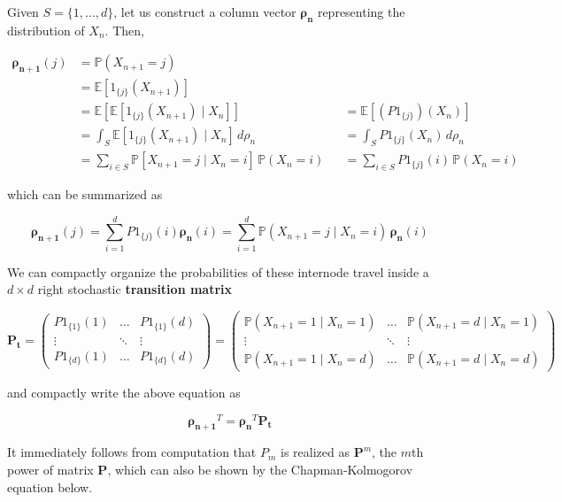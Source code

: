 \documentclass{article}
\begin{document}
  \begin{example}
    Given $S = \{1, \ldots, d\}$, let us construct a column vector $\boldsymbol{\rho_n}$ representing the distribution of $X_n$. Then, 

    \begin{align*}
      \boldsymbol{\rho_{n+1}} (j) & = \mathbb{P}(X_{n + 1} = j) \\
      & =  \mathbb{E}[1_{\{j\}} (X_{n+1})] \\
      & = \mathbb{E} [ \mathbb{E}[1_{\{j\}} (X_{n+1}) \mid X_n] ] && = \mathbb{E}[(P 1_{\{j\}}) (X_n)] \\
      & = \int_S \mathbb{E}[1_{\{j\}} (X_{n+1}) \mid X_n] \, d\rho_n && = \int_S P 1_{\{j\}} (X_n) \, d\rho_n \\
      & = \sum_{i \in S} \mathbb{P}[ X_{n+1} = j \mid X_n = i] \, \mathbb{P}(X_n = i) && = \sum_{i \in S} P 1_{\{j\}} (i) \, \mathbb{P}(X_n = i) 
    \end{align*}

    which can be summarized as 

    \[\boldsymbol{\rho_{n + 1}} (j) = \sum_{i = 1}^d P 1_{\{j\}} (i) \boldsymbol{\rho_n} (i) = \sum_{i = 1}^d \mathbb{P}(X_{n+1} = j \mid X_n = i) \, \boldsymbol{\rho_n} (i)\]

    We can compactly organize the probabilities of these internode travel inside a $d \times d$ right stochastic \textbf{transition matrix}

      \[\mathbf{P_t} = \begin{pmatrix} P 1_{\{1\}} (1) & \ldots & P 1_{\{1\}} (d) \\ \vdots & \ddots & \vdots \\ P 1_{\{d\}} (1) & \ldots & P 1_{\{d\}} (d) \end{pmatrix} = \begin{pmatrix} \mathbb{P}(X_{n+1} = 1 \mid X_n = 1) & \ldots & \mathbb{P}(X_{n+1} = d \mid X_n = 1) \\ \vdots & \ddots & \vdots \\ \mathbb{P}(X_{n+1} = 1 \mid X_n = d) & \ldots & \mathbb{P}(X_{n+1} = d \mid X_n = d) \end{pmatrix} \]

    and compactly write the above equation as 

      \[\boldsymbol{\rho_{n + 1}}^T = \boldsymbol{\rho_{n}}^T \mathbf{P_t}\]

    It immediately follows from computation that $P_m$ is realized as $\mathbf{P}^m$, the $m$th power of matrix $\mathbf{P}$, which can also be shown by the Chapman-Kolmogorov equation below. 
  \end{example}
\end{document}
